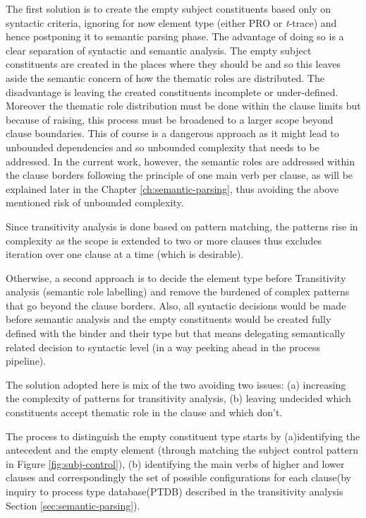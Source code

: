 The first solution is to create the empty subject constituents based only on syntactic criteria, ignoring for now element type (either PRO or \textit{t}-trace) and hence postponing it to semantic parsing phase. The advantage of doing so is a clear separation of syntactic and semantic analysis. The empty subject constituents are created in the places where they should be and so this leaves aside the semantic concern of how the thematic roles are distributed. The disadvantage is leaving the created constituents incomplete or under-defined. Moreover the thematic role distribution must be done within the clause limits but because of raising, this process must be broadened to a larger scope beyond clause boundaries. This of course is a dangerous approach as it might lead to unbounded dependencies and so unbounded complexity that needs to be addressed. 
In the current work, however, the semantic roles are addressed within the clause borders following the principle of one main verb per clause, as will be explained later in the Chapter \ref{ch:semantic-parsing}, thus avoiding the above mentioned risk of unbounded complexity. 

Since transitivity analysis is done based on pattern matching, the patterns rise in complexity as the scope is extended to two or more clauses thus excludes iteration over one clause at a time (which is desirable). 

Otherwise, a second approach is to decide the element type before Transitivity analysis (semantic role labelling) and remove the burdened of complex patterns that go beyond the clause borders. Also, all syntactic decisions would be made before semantic analysis and the empty constituents would be created fully defined with the binder and their type but that means delegating semantically related decision to syntactic level (in a way peeking ahead in the process pipeline).

The solution adopted here is mix of the two avoiding two issues: (a) increasing the complexity of patterns for transitivity analysis, (b) leaving undecided which constituents accept thematic role in the clause and which don't. 

The process to distinguish the empty constituent type starts by (a)identifying the antecedent and the empty element (through matching the subject control pattern in Figure \ref{fig:subj-control}), (b) identifying the main verbs of higher and lower clauses and correspondingly the set of possible configurations for each clause(by inquiry to process type database(PTDB) described in the transitivity analysis Section \ref{sec:semantic-parsing}).

